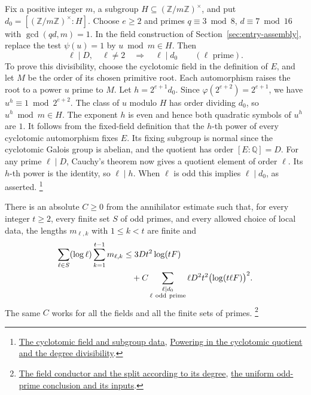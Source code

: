 Fix a positive integer \(m\), a subgroup
\(H\subseteq(\mathbb Z/m\mathbb Z)^\times\), and put
\(d_0=[(\mathbb Z/m\mathbb Z)^\times:H]\). Choose \(e\ge2\) and
primes \(q\equiv3\bmod8\), \(d\equiv7\bmod16\) with
\(\gcd(qd,m)=1\). In the field construction of
Section~\ref{sec:entry-assembly}, replace the test \(\psi(u)=1\)
by \(u\bmod m\in H\). Then
\[
       \ell\mid D,\quad \ell\ne2\quad\Longrightarrow\quad
       \ell\mid d_0
       \qquad(\ell\text{ prime}).
\]
To prove this divisibility, choose the cyclotomic field in the
definition of \(E\), and let \(M\) be the order of its chosen
primitive root. Each automorphism raises the root to a power \(u\)
prime to \(M\). Let \(h=2^{e+1}d_0\). Since
\(\varphi(2^{e+2})=2^{e+1}\), we have \(u^h\equiv1\bmod 2^{e+2}\).
The class of \(u\) modulo \(H\) has order dividing \(d_0\), so
\(u^h\bmod m\in H\). The exponent \(h\) is even and hence both
quadratic symbols of \(u^h\) are \(1\). It follows from the
fixed-field definition that the \(h\)-th power of every cyclotomic
automorphism fixes \(E\). Its fixing subgroup is normal since the
cyclotomic Galois group is abelian, and the quotient has order
\([E:\mathbb Q]=D\). For any prime \(\ell\mid D\), Cauchy's theorem
now gives a quotient element of order \(\ell\). Its \(h\)-th power is
the identity, so \(\ell\mid h\). When \(\ell\) is odd this implies
\(\ell\mid d_0\), as asserted.
\footnote{\href{https://github.com/Deicyde/riemann-hypothesis/blob/40e56bab/src/Development/AutomorphicArithmetic/AutomorphicVarieties/StmtFields.lean\#L11-L45}{The cyclotomic field and subgroup data},
\href{https://github.com/Deicyde/riemann-hypothesis/blob/40e56bab/src/Development/AutomorphicArithmetic/AutomorphicVarieties/OddResidueBounds/DegExistsLift.lean\#L33-L99}{Powering in the cyclotomic quotient and the degree divisibility}.}

There is an absolute \(C\ge0\) from the annihilator estimate
such that, for every integer \(t\ge2\), every finite set \(S\) of
odd primes, and every allowed choice of local data, the lengths
\(m_{\ell,k}\) with \(1\le k<t\) are finite and
\begin{align}
 \sum_{\ell\in S}(\log\ell)\sum_{k=1}^{t-1}m_{\ell,k}
 &\le 3Dt^2\log(tF) \notag\\
 &\quad{}+
 C\sum_{\substack{\ell\mid d_0\\\ell\ {\rm odd\ prime}}}
       \ell D^2t^2\bigl(\log(t\ell F)\bigr)^2 .
 \label{eq:galois-odd-minus-bound}
\end{align}
The same \(C\) works for all the fields and all the finite sets of primes.
\footnote{\href{https://github.com/Deicyde/riemann-hypothesis/blob/40e56bab/src/Development/AutomorphicArithmetic/AutomorphicVarieties/OddResidueBounds/ThmBcOfPsiBound.lean\#L147-L177}{The field conductor and the split according to its degree},
\href{https://github.com/Deicyde/riemann-hypothesis/blob/40e56bab/src/Development/AutomorphicArithmetic/AutomorphicVarieties/OddResidueBounds/ThmBcOfPsiBound.lean\#L266-L295}{the uniform odd-prime conclusion and its inputs}.}

